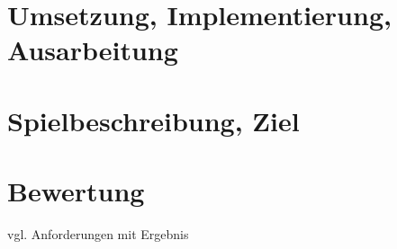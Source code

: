 \documentclass[11pt]{article}
\begin{document}
\section{Umsetzung, Implementierung, Ausarbeitung}
\section{Spielbeschreibung, Ziel}
\section{Bewertung}
vgl. Anforderungen mit Ergebnis

\pagebreak
\printbibliography
\end{document}
